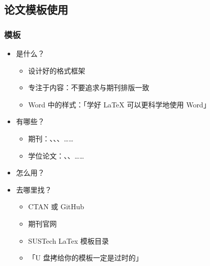 \subsection{论文模板使用}
\begin{frame}[fragile]
  \frametitle{模板}
  \begin{itemize}
    \item<+-> 是什么？
  
      \begin{itemize}
        \item 设计好的格式框架
        \item 专注于内容：\alert{不要追求与期刊排版一致}
        \item Word 中的样式：「学好 \LaTeX{} 可以更科学地使用 Word」
      \end{itemize}
  
    \item<+-> 有哪些？
  
      \begin{itemize}
        \item 期刊：、、、……
        \item 学位论文：、、\alert{}……
      \end{itemize}
  
    \item<+-> 怎么用？
  
  
    \item<+-> 去哪里找？
  
      \begin{itemize}
        \item CTAN  或 GitHub \href{https://github.com}{\faGithub}
        \item 期刊官网
        \item SUSTech LaTex 模板目录 
        \item 「U 盘拷给你的模板一定是过时的」
      \end{itemize}
  \end{itemize}
\end{frame}


